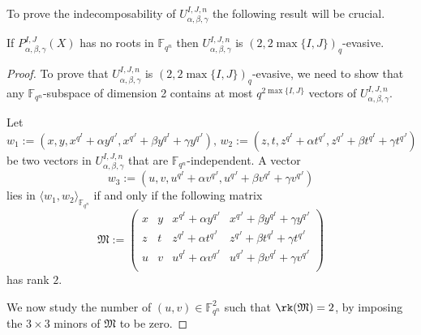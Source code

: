 


To prove the indecomposability of $U_{\alpha, \beta, \gamma}^{I,J,n}$ the following result will be crucial. 
\begin{theorem}
\label{thm:evasive}
If  $P^{I,J}_{\alpha,\beta,\gamma}(X)$ has no roots in $\mathbb{F}_{q^n}$ then $U_{\alpha, \beta, \gamma}^{I,J,n}$ is $(2,2\max\{I,J\})_q $-evasive. 
\end{theorem}

\begin{proof}
To prove that $U_{\alpha, \beta, \gamma}^{I,J,n}$ is $(2,2\max\{I,J\})_q $-evasive, we need to show that any $\mathbb{F}_{q^n}$-subspace of dimension 2 contains at most $q^{2\max\{I,J\}}$ vectors of $U_{\alpha, \beta, \gamma}^{I,J,n}$.

Let 
{\small \[w_1:=\left(x,y,x^{q^I}+\alpha y^{q^J},x^{q^J}+\beta y^{q^I} + \gamma y^{q^J}\right), \, w_2:=\left(z,t,z^{q^I}+\alpha t^{q^J},z^{q^J}+\beta t^{q^I} + \gamma t^{q^J}\right)\] }
be two vectors in $U_{\alpha, \beta, \gamma}^{I,J,n}$ that are $\mathbb{F}_{q^n}$-independent. A vector 
\[w_3:=\left(u,v,u^{q^I}+\alpha v^{q^J},u^{q^J}+\beta v^{q^I} + \gamma v^{q^J}\right)\] 
lies in $\langle w_1,w_2\rangle_{\mathbb{F}_{q^n}}$ if and only if the following matrix 
\begin{equation*}
    \mathfrak{M}:=\begin{pmatrix}
    x & y & x^{q^I}+\alpha y^{q^J} & x^{q^J}+\beta y^{q^I} + \gamma y^{q^J}\\
    z & t & z^{q^I}+\alpha t^{q^J} & z^{q^J}+\beta t^{q^I} + \gamma t^{q^J}\\
    u & v & u^{q^I}+\alpha v^{q^J} & u^{q^J}+\beta v^{q^I} + \gamma v^{q^J}\\
    \end{pmatrix}
\end{equation*}  has rank $2$.

We now study the number of $(u,v)\in {\mathbb F}_{q^n}^2$ such that $\rk(\mathfrak{M})=2$, by imposing the $3\times 3$ minors of $\mathfrak{M}$ to be zero.


\end{proof}

